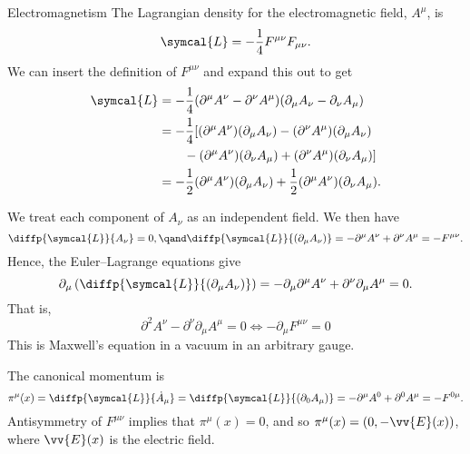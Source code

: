 \documentclass[fleqn]{NotesClass}
\newcommand{\dalembertian}{\partial^2}
\newcommand{\lagrangianDensity}{\symcal{L}}
\begin{document}
    \begin{exm}{Electromagnetism}{}
        The Lagrangian density for the electromagnetic field, \(A^\mu\), is
        \begin{equation}
            \lagrangianDensity = -\frac{1}{4}F^{\mu\nu}F_{\mu\nu}.
        \end{equation}
        We can insert the definition of \(F^{\mu\nu}\) and expand this out to get
        \begin{align}
            \lagrangianDensity &= -\frac{1}{4}(\partial^\mu A^\nu - \partial^\nu A^\mu)(\partial_\mu A_\nu - \partial_\nu A_\mu)\\
            &= -\frac{1}{4}[(\partial^\mu A^\nu)(\partial_\mu A_\nu) - (\partial^\nu A^\mu)(\partial_\mu A_\nu)\\
            &\qquad- (\partial^\mu A^\nu)(\partial_\nu A_\mu) + (\partial^\nu A^\mu)(\partial_\nu A_\mu)]\\
            &= -\frac{1}{2}(\partial^\mu A^\nu)(\partial_\mu A_\nu) + \frac{1}{2}(\partial^\mu A^\nu)(\partial_\nu A_\mu).
        \end{align}
        
        We treat each component of \(A_\nu\) as an independent field.
        We then have
        \begin{equation}
            \diffp{\lagrangianDensity}{A_\nu} = 0, \qand \diffp{\lagrangianDensity}{(\partial_\mu A_\nu)} = -\partial^\mu A^\nu + \partial^\nu A^\mu = -F^{\mu\nu}.
        \end{equation}
        Hence, the Euler--Lagrange equations give
        \begin{equation}
            \partial_\mu\left( \diffp{\lagrangianDensity}{(\partial_\mu A_\nu)} \right) = -\partial_\mu \partial^\mu A^\nu + \partial^\nu \partial_\mu A^\mu = 0.
        \end{equation}
        That is,
        \begin{equation}
            \dalembertian A^\nu - \partial^\nu \partial_\mu A^\mu = 0 \iff -\partial_\mu F^{\mu\nu} = 0
        \end{equation}
        This is Maxwell's equation in a vacuum in an arbitrary gauge.
        
        The canonical momentum is
        \begin{equation}
            \pi^\mu(x) = \diffp{\lagrangianDensity}{\dot{A}_\mu} = \diffp{\lagrangianDensity}{(\partial_0 A_\mu)} = -\partial^\mu A^0 + \partial^0 A^\mu = -F^{0\mu}.
        \end{equation}
        Antisymmetry of \(F^{\mu\nu}\) implies that \(\pi^\mu(x) = 0\), and so \(\pi^\mu(x) = (0, -\vv{E}(x))\), where \(\vv{E}(x)\) is the electric field.
        

\end{exm}
\end{document}
